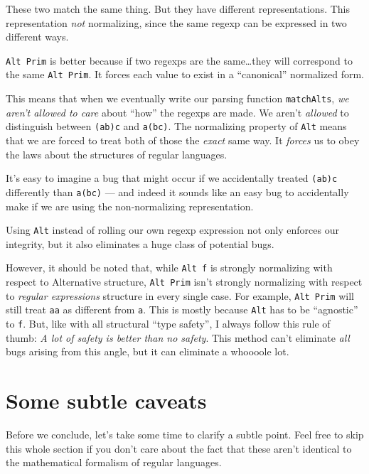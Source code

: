 \documentclass[]{article}
\begin{document}
These two match the same thing. But they have different representations. This
representation \emph{not} normalizing, since the same regexp can be expressed in
two different ways.

\texttt{Alt\ Prim} is better because if two regexps are the same\ldots they will
correspond to the same \texttt{Alt\ Prim}. It forces each value to exist in a
``canonical'' normalized form.

This means that when we eventually write our parsing function
\texttt{matchAlts}, \emph{we aren't allowed to care} about ``how'' the regexps
are made. We aren't \emph{allowed} to distinguish between
\texttt{(a\textbar{}b)\textbar{}c} and \texttt{a\textbar{}(b\textbar{}c)}. The
normalizing property of \texttt{Alt} means that we are forced to treat both of
those the \emph{exact} same way. It \emph{forces} us to obey the laws about the
structures of regular languages.

It's easy to imagine a bug that might occur if we accidentally treated
\texttt{(a\textbar{}b)\textbar{}c} differently than
\texttt{a\textbar{}(b\textbar{}c)} --- and indeed it sounds like an easy bug to
accidentally make if we are using the non-normalizing representation.

Using \texttt{Alt} instead of rolling our own regexp expression not only
enforces our integrity, but it also eliminates a huge class of potential bugs.

However, it should be noted that, while \texttt{Alt\ f} is strongly normalizing
with respect to Alternative structure, \texttt{Alt\ Prim} isn't strongly
normalizing with respect to \emph{regular expressions} structure in every single
case. For example, \texttt{Alt\ Prim} will still treat \texttt{a\textbar{}a} as
different from \texttt{a}. This is mostly because \texttt{Alt} has to be
``agnostic'' to \texttt{f}. But, like with all structural ``type safety'', I
always follow this rule of thumb: \emph{A lot of safety is better than no
safety}. This method can't eliminate \emph{all} bugs arising from this angle,
but it can eliminate a whoooole lot.

\hypertarget{some-subtle-caveats}{%
\section{Some subtle caveats}\label{some-subtle-caveats}}

Before we conclude, let's take some time to clarify a subtle point. Feel free to
skip this whole section if you don't care about the fact that these aren't
identical to the mathematical formalism of regular languages.
\end{document}

